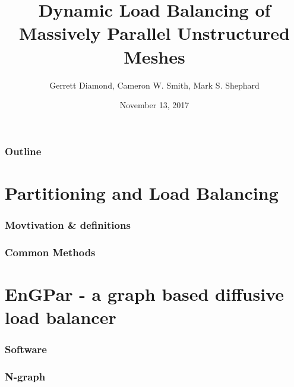 \documentclass{beamer}
\begin{document}
\title[Unstructured Mesh Workflows]
{
Dynamic Load Balancing of Massively Parallel Unstructured Meshes
}
\author{Gerrett Diamond, Cameron W. Smith, Mark S. Shephard}


\date{November 13, 2017}

\begin{frame}[plain]
  \titlepage
\end{frame}

\begin{frame}
  \frametitle{Outline}
  \tableofcontents
\end{frame}

\section{Partitioning and Load Balancing}
\begin{frame}
  \frametitle{Movtivation \& definitions}
  
  
\end{frame}

\begin{frame}
  \frametitle{Common Methods}
  
\end{frame}

\section{EnGPar - a graph based diffusive load balancer}
\begin{frame}
  \frametitle{Software}
\end{frame}

\begin{frame}
  \frametitle{N-graph}
  
\end{frame}
\end{document}
